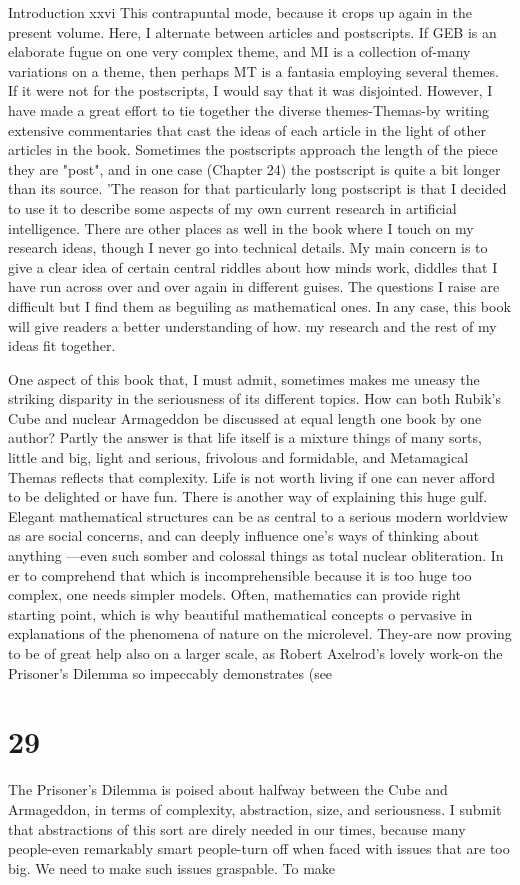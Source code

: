 Introduction                                                                        xxvi This contrapuntal mode, because it crops up again in the present volume. Here, I alternate between articles and postscripts. If GEB is an elaborate fugue on one very complex theme, and MI is a collection of-many variations on a theme, then perhaps MT is a fantasia employing several themes. If it were not for the postscripts, I would say that it was disjointed. However, I have made a great effort to tie together the diverse themes-Themas-by writing extensive commentaries that cast the ideas of each article in the light of other articles in the book. Sometimes the postscripts approach the length of the piece they are "post", and in one case (Chapter 24) the postscript is quite a bit longer than its source. 'The reason for that particularly long postscript is that I decided to use it to describe some aspects of my own current research in artificial intelligence. There are other places as well in the book where I touch on my research ideas, though I never go into technical details. My main concern is to give a clear idea of certain central riddles about how minds work, diddles that I have run across over and over again in different guises. The questions I raise are difficult but I find them as beguiling as mathematical ones. In any case, this book will give readers a better understanding of how. my research and the rest of my ideas fit together. 
\separator

One aspect of this book that, I must admit, sometimes makes me uneasy the striking disparity in the seriousness of its different topics. How can both Rubik's Cube and nuclear Armageddon be discussed at equal length one book by one author? Partly the answer is that life itself is a mixture things of many sorts, little and big, light and serious, frivolous and formidable, and Metamagical Themas reflects that complexity. Life is not worth living if one can never afford to be delighted or have fun. There is another way of explaining this huge gulf. Elegant mathematical structures can be as central to a serious modern worldview as are social concerns, and can deeply influence one's ways of thinking about anything ---even such somber and colossal things as total nuclear obliteration. In er to comprehend that which is incomprehensible because it is too huge too complex, one needs simpler models. Often, mathematics can provide right starting point, which is why beautiful mathematical concepts o pervasive in explanations of the phenomena of nature on the microlevel. They-are now proving to be of great help also on a larger scale, as Robert Axelrod's lovely work-on the Prisoner's Dilemma so impeccably demonstrates (see \chapter {29}
The Prisoner's Dilemma is poised about halfway between the Cube and Armageddon, in terms of complexity, abstraction, size, and seriousness. I submit that abstractions of this sort are direly needed in our times, because many people-even remarkably smart people-turn off when faced with issues that are too big. We need to make such issues graspable. To make 



